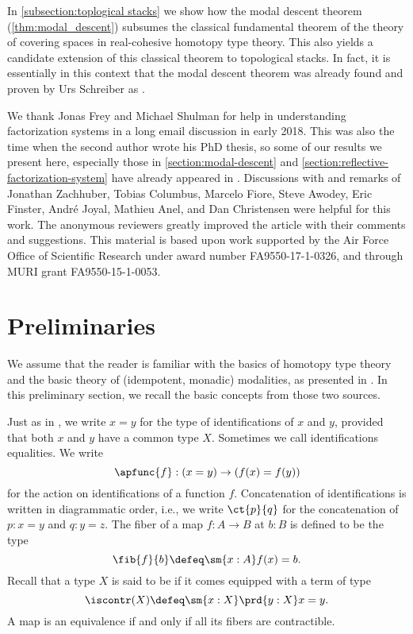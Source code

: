 \documentclass{msc}
\begin{document}
In \cref{subsection:toplogical stacks} we show how the modal descent theorem (\cref{thm:modal_descent})
subsumes the classical fundamental theorem of the theory of covering spaces in real-cohesive homotopy type theory.
This also yields a candidate extension of this classical theorem to topological stacks.
In fact, it is essentially in this context that the modal descent theorem was already found and proven by Urs Schreiber as \cite[Proposition 5.2.42]{SchreiberDcct}.
  
We thank Jonas Frey and Michael Shulman for help in understanding factorization systems in a long email discussion in early 2018. This was also the time when the second author wrote his PhD thesis, so some of our results we present here, especially those in \cref{section:modal-descent} and \cref{section:reflective-factorization-system} have already appeared in \cite{rijke-phd}.
Discussions with and remarks of Jonathan Zachhuber, Tobias Columbus, Marcelo Fiore, Steve Awodey, Eric Finster, André Joyal, Mathieu Anel, and Dan Christensen were helpful for this work.
The anonymous reviewers greatly improved the article with their comments and suggestions. 
This material is based upon work supported by the Air Force Office of Scientific Research under award number FA9550-17-1-0326, and through MURI grant FA9550-15-1-0053.


\section{Preliminaries}
We assume that the reader is familiar with the basics of homotopy type theory \cite{UFP} and the basic theory of (idempotent, monadic) modalities, as presented in \cite{RijkeSpittersShulman}. In this preliminary section, we recall the basic concepts from those two sources.

Just as in \cite{UFP}, we write $x=y$ for the type of identifications of $x$ and $y$, provided that both $x$ and $y$ have a common type $X$. Sometimes we call identifications equalities. We write
\begin{equation*}
  \apfunc{f}:(x=y)\to (f(x)=f(y))
\end{equation*}
for the action on identifications of a function $f$. Concatenation of identifications is written in diagrammatic order, i.e., we write $\ct{p}{q}$ for the concatenation of $p:x=y$ and $q:y=z$. The fiber of a map $f:A\to B$ at $b:B$ is defined to be the type
\begin{equation*}
  \fib{f}{b}\defeq \sm{x:A}f(x)=b.
\end{equation*}
Recall that a type $X$ is said to be  if it comes equipped with a term of type
\begin{equation*}
  \iscontr(X)\defeq \sm{x:X}\prd{y:X}x=y.
\end{equation*}
A map is an equivalence if and only if all its fibers are contractible.
\end{document}

